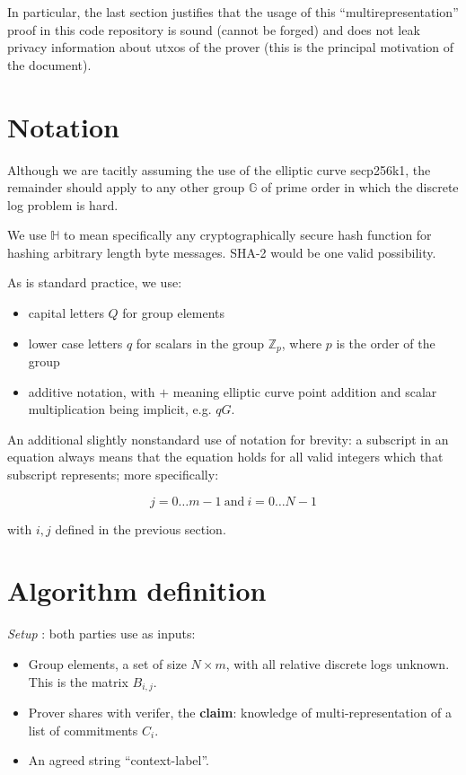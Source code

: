 \documentclass[10pt,a4paper]{article}
\begin{document}
In particular, the last section justifies that the usage of this ``multirepresentation'' proof in this code repository is sound (cannot be forged) and does not leak privacy information about utxos of the prover (this is the principal motivation of the document).

\section{Notation}

Although we are tacitly assuming the use of the elliptic curve secp256k1, the remainder should apply to any other group $\mathbb{G}$ of prime order in which the discrete log problem is hard.

We use $\mathbb{H}$ to mean specifically any cryptographically secure hash function for hashing arbitrary length byte messages. SHA-2 would be one valid possibility.

As is standard practice, we use:

\begin{itemize}
\item capital letters $Q$ for group elements
\item lower case letters $q$ for scalars in the group $\mathbb{Z}_p$, where $p$ is the order of the group
\item additive notation, with $+$ meaning elliptic curve point addition and scalar multiplication being implicit, e.g. $qG$.
\end{itemize}

An additional slightly nonstandard use of notation for brevity: a subscript in an equation always means that the equation holds for all valid integers which that subscript represents; more specifically:

$$ j= 0 \ldots m-1 \ \textrm{and}\ i=0 \ldots N-1$$

with $i, j$ defined in the previous section.

\section{Algorithm definition}

\emph{Setup} : both parties use as inputs:

\begin{itemize}
\item Group elements, a set of size $N \times m$, with all relative discrete logs unknown. This is the matrix $B_{i,j}$.
\item Prover shares with verifer, the \textbf{claim}: knowledge of multi-representation of a list of commitments $C_i$.
\item An agreed string ``context-label''.
\end{itemize}
\vspace{5 pt}
\end{document}
